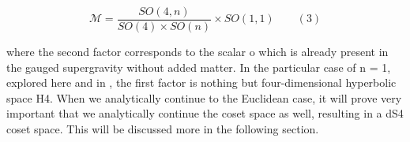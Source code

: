 \documentclass{article}
\begin{document}
\begin{equation}
\mathcal { M } = \frac { S O ( 4, n ) } { S O ( 4 ) \times S O ( n ) } \times S O ( 1, 1 ) \qquad ( 3 )
\end{equation}


where the second factor corresponds to the scalar o which is already present in the gauged
supergravity without added matter. In the particular case of n = 1, explored here and in ,
the first factor is nothing but four-dimensional hyperbolic space H4. When we analytically
continue to the Euclidean case, it will prove very important that we analytically continue
the coset space as well, resulting in a dS4 coset space. This will be discussed more in the
following section.
\end{document}
